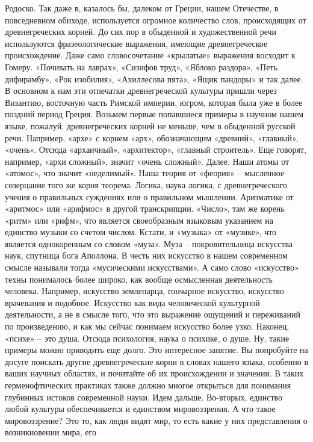 Родоско. Так даже в, казалось бы, далеком от Греции, нашем Отечестве, в
повседневном обиходе, используется огромное количество слов, происходящих от
древнегреческих корней. До сих пор в обыденной и художественной речи
используются фразеологические выражения, имеющие древнегреческое происхождение.
Даже само словосочетание «крылатые» выражения восходит к Гомеру. «Почивать на
лаврах», «Сизифов труд», «Яблоко раздора», «Петь дифирамбу», «Рок изобилия»,
«Ахиллесова пята», «Ящик пандоры» и так далее. В основном к нам эти отпечатки
древнегреческой культуры пришли через Византию, восточную часть Римской империи,
югром, которая была уже в более поздний период Греция. Возьмем первые попавшиеся
примеры в научном нашем языке, пожалуй, древнегреческих корней не меньше, чем в
обыденной русской речи. Например, «архе» с корнем «арх», обозначающим «древний»,
«главный», «очень». Отсюда «архаичный», «архитектор», «главный строитель». Еще
говорят, например, «архи сложный», значит «очень сложный». Далее. Наши атомы от
«атомос», что значит «неделимый». Наша теория от «феория» – мысленное созерцание
того же корня теорема. Логика, наука логика, с древнегреческого учения о
правильных суждениях или о правильном мышлении. Аризматике от «аритмос» или
«арифмос» в другой транскрипции. «Число», там же корень «ритм» или «рифм», что
является своеобразным языковым указанием на единство музыки со счетом числом.
Кстати, и «музыка» от «музике», что является однокоренным со словом «муза». Муза
– покровительница искусства наук, спутница бога Аполлона. В честь них искусство
в нашем современном смысле называли тогда «мусическими искусствами». А само
слово «искусство» техны понималось более широко, как вообще осмысленная
деятельность человека. Например, искусство землепарца, гончарное искусство,
искусство врачевания и подобное. Искусство как вида человеческой культурной
деятельности, а не в смысле того, что это выражение ощущений и переживаний по
произведению, и как мы сейчас понимаем искусство более узко. Наконец, «психе» –
это душа. Отсюда психология, наука о психике, о душе. Ну, такие примеры можно
приводить еще долго. Это интересное занятие. Вы попробуйте на досуге поискать
другие древнегреческие корни в словах нашего языка, особенно в ваших научных
областях, и почитайте об их происхождении и значении. В таких герменофтических
практиках также должно многое открыться для понимания глубинных истоков
современной науки. Идем дальше. Во-вторых, единство любой культуры
обеспечивается и единством мировоззрения. А что такое мировоззрение? Это то, как
люди видят мир, то есть какие у них представления о возникновении мира, его
